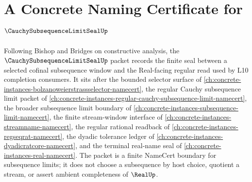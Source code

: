 \chapter{A Concrete Naming Certificate for $\CauchySubsequenceLimitSealUp$}
\label{ch:concrete-instances-cauchy-subsequence-limit-seal-namecert}

Following Bishop and Bridges on constructive analysis, the $\CauchySubsequenceLimitSealUp$ packet records the finite seal between a selected cofinal subsequence window and the Real-facing regular read used by L10 completion consumers. It sits after the bounded selector surface of \autoref{ch:concrete-instances-bolzanoweierstrassselector-namecert}, the regular Cauchy subsequence limit packet of \autoref{ch:concrete-instances-regular-cauchy-subsequence-limit-namecert}, the broader subsequence limit boundary of \autoref{ch:concrete-instances-subsequence-limit-namecert}, the finite stream-window interface of \autoref{ch:concrete-instances-streamname-namecert}, the regular rational readback of \autoref{ch:concrete-instances-regseqrat-namecert}, the dyadic tolerance ledger of \autoref{ch:concrete-instances-dyadicratcore-namecert}, and the terminal real-name seal of \autoref{ch:concrete-instances-real-namecert}. The packet is a finite NameCert boundary for subsequence limits; it does not choose a subsequence by host choice, quotient a stream, or assert ambient completeness of $\RealUp$.

